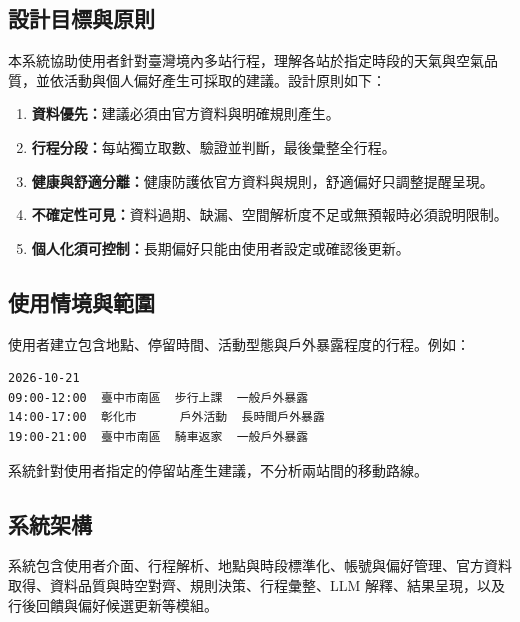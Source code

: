 \documentclass[conference]{IEEEtran}
\begin{document}
\subsection{設計目標與原則}
本系統協助使用者針對臺灣境內多站行程，理解各站於指定時段的天氣與空氣品質，並依活動與個人偏好產生可採取的建議。設計原則如下：
\begin{enumerate}[leftmargin=*]
\item \textbf{資料優先：}建議必須由官方資料與明確規則產生。
\item \textbf{行程分段：}每站獨立取數、驗證並判斷，最後彙整全行程。
\item \textbf{健康與舒適分離：}健康防護依官方資料與規則，舒適偏好只調整提醒呈現。
\item \textbf{不確定性可見：}資料過期、缺漏、空間解析度不足或無預報時必須說明限制。
\item \textbf{個人化須可控制：}長期偏好只能由使用者設定或確認後更新。
\end{enumerate}

\subsection{使用情境與範圍}
使用者建立包含地點、停留時間、活動型態與戶外暴露程度的行程。例如：
\begin{verbatim}
2026-10-21
09:00-12:00  臺中市南區  步行上課  一般戶外暴露
14:00-17:00  彰化市      戶外活動  長時間戶外暴露
19:00-21:00  臺中市南區  騎車返家  一般戶外暴露
\end{verbatim}
系統針對使用者指定的停留站產生建議，不分析兩站間的移動路線。

\subsection{系統架構}
系統包含使用者介面、行程解析、地點與時段標準化、帳號與偏好管理、官方資料取得、資料品質與時空對齊、規則決策、行程彙整、LLM 解釋、結果呈現，以及行後回饋與偏好候選更新等模組。
\end{document}
